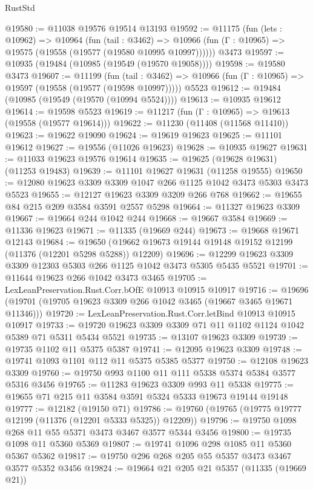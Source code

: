 \begin{lexlean}{RustStd}
\begin{coremodule}
{\begin{coremodule}
{{{{{{{{{{{{{{{{{{{{{{{{{{{{{{{{{{{{{{{{{{{{{{{{{{{{{{{{{{{{{{{{{{{{{{{{{{{{{{{{{{{{{@19580 := @11038 @19576 @19514 @13193
@19592 := @11175
    (fun (lets : @10962) =>
    @10964
      (fun (tail : @3462) =>
      @10966 (fun (Γ : @10965) => @19575 (@19558 (@19577 (@19580 @10995 @10997))))))
    @3473
@19597 := @10935 (@19484 (@10985 (@19549 (@19570 @19058))))
@19598 := @19580 @3473
@19607 := @11199
    (fun (tail : @3462) => @10966 (fun (Γ : @10965) => @19597 (@19558 (@19577 (@19598 @10997)))))
    @5523
@19612 := @19484 (@10985 (@19549 (@19570 (@10994 @5524))))
@19613 := @10935 @19612
@19614 := @19598 @5523
@19619 := @11217 (fun (Γ : @10965) => @19613 (@19558 (@19577 @19614)))
@19622 := @11230 (@11408 (@11568 @11410))
@19623 := @19622 @19090
@19624 := @19619 @19623
@19625 := @11101 @19612
@19627 := @19556 (@11026 @19623)
@19628 := @10935 @19627
@19631 := @11033 @19623 @19576 @19614
@19635 := @19625 (@19628 @19631) (@11253 @19483)
@19639 := @11101 @19627 @19631 (@11258 @19555)
@19650 := @12080 @19623 @3309 @3309 @1047 @266 @1125 @1042 @3473 @5303 @3473 @5523
@19655 := @12127 @19623 @3309 @3209 @266 @768
@19662 := @19655 @84 @215 @209 @3584 @3591 @2557 @5298
@19664 := @11327 @19623 @3309
@19667 := @19664 @244 @1042 @244
@19668 := @19667 @3584
@19669 := @11336 @19623
@19671 := @11335 (@19669 @244)
@19673 := @19668 @19671 @12143
@19684 := @19650 (@19662 @19673 @19144 @19148 @19152 @12199 (@11376 (@12201 @5298 @5288)) @12209)
@19696 := @12299 @19623 @3309 @3309 @12303 @5303 @266 @1125 @1042 @3473 @5305 @5435 @5521
@19701 := @11644 @19623 @266 @1042 @3473 @3465
@19705 := LexLeanPreservation.Rust.Corr.bOfE @10913 @10915 @10917
@19716 := @19696 (@19701 (@19705 @19623 @3309 @266 @1042 @3465 (@19667 @3465 @19671 @11346)))
@19720 := LexLeanPreservation.Rust.Corr.letBind @10913 @10915 @10917
@19733 := @19720 @19623 @3309 @3309 @71 @11 @1102 @1124 @1042 @5389 @71 @5311 @5434 @5521
@19735 := @13107 @19623 @3309
@19739 := @19735 @1102 @11 @5375 @5387
@19741 := @12095 @19623 @3309
@19748 := @19741 @1093 @1101 @112 @11 @5375 @5385 @5377
@19750 := @12108 @19623 @3309
@19760 := @19750 @993 @1100 @11 @111 @5338 @5374 @5384 @3577 @5316 @3456
@19765 := @11283 @19623 @3309 @993 @11 @5338
@19775 := @19655 @71 @215 @11 @3584 @3591 @5324 @5333 @19673 @19144 @19148
@19777 := @12182 (@19150 @71)
@19786 := @19760 (@19765 (@19775 @19777 @12199 (@11376 (@12201 @5333 @5325)) @12209))
@19796 := @19750 @1098 @268 @11 @55 @5371 @3473 @3467 @3577 @5344 @3456
@19800 := @19735 @1098 @11 @5360 @5369
@19807 := @19741 @1096 @298 @1085 @11 @5360 @5367 @5362
@19817 := @19750 @296 @268 @205 @55 @5357 @3473 @3467 @3577 @5352 @3456
@19824 := @19664 @21 @205 @21 @5357 (@11335 (@19669 @21))
}}}}}}}}}}}}}}}}}}}}}}}}}}}}}}}}}}}}}}}}}}}}}}}}}}}}}}}}}}}}}}}}}}}}}}}}}}}}}}}}}}}}}
\end{coremodule}}
\end{coremodule}
\end{lexlean}
